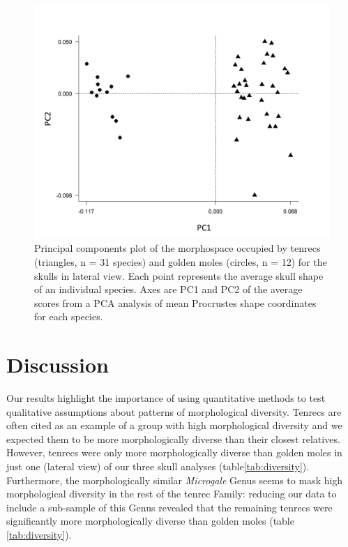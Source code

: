 \documentclass[12pt,a4paper]{article}
\begin{document}
		
	\begin{figure}[H]
	\centering
	\includegraphics[width=1\linewidth]{figures/sklat_PCA_allspecies_BW.png}
	\caption[Morphospace (principal components) plot of morphological diversity in lateral views of tenrec and golden mole skulls.]
		{Principal components plot of the morphospace occupied by tenrecs (triangles, n = 31 species) and golden moles (circles, n = 12) for the skulls in lateral view. Each point represents the average skull shape of an individual species. Axes are PC1 and PC2 of the average scores from a PCA analysis of mean Procrustes shape coordinates for each species.}
	\label{fig:sklatPCA}
	\end{figure}


\section{Discussion} 

	Our results highlight the importance of using quantitative methods to test qualitative assumptions about patterns of morphological diversity. Tenrecs are often cited as an example of a group with high morphological diversity \citep{Olson2013, Soarimalala2011, Eisenberg1969} and we expected them to be more morphologically diverse than their closest relatives. However, tenrecs were only more morphologically diverse than golden moles in just one (lateral view) of our three skull analyses (table\ref{tab:diversity}). Furthermore, the morphologically similar \textit{Microgale} Genus seems to mask high morphological diversity in the rest of the tenrec Family: reducing our data to include a sub-sample of this Genus revealed that the remaining tenrecs were significantly more morphologically diverse than golden moles (table \ref{tab:diversity}). 
\end{document}
